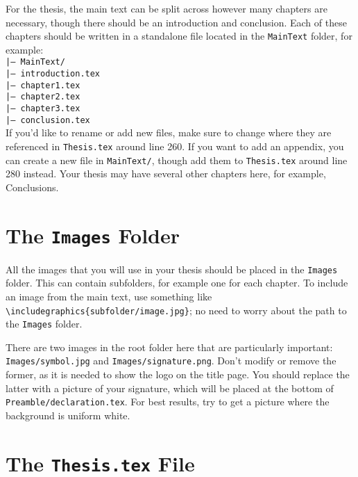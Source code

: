 For the thesis, the main text can be split across however many chapters are
necessary, though there should be an introduction and conclusion.
Each of these chapters should be written in a standalone file located in
the \texttt{MainText} folder, for example:
\texttt{
\\
|--- MainText/ \\ 
\hspace*{0.5cm}|--- introduction.tex\\
\hspace*{0.5cm}|--- chapter1.tex\\
\hspace*{0.5cm}|--- chapter2.tex\\
\hspace*{0.5cm}|--- chapter3.tex\\
\hspace*{0.5cm}|--- conclusion.tex\\
}
If you'd like to rename or add new files, make sure to change where they are
referenced in \texttt{Thesis.tex} around line 260. If you want
to add an appendix, you can create a new file in \texttt{MainText/}, though
add them to \texttt{Thesis.tex} around line 280 instead.
Your thesis may have several other chapters here, for example, Conclusions.

\section{The \texttt{Images} Folder}

All the images that you will use in your thesis should be placed in the \texttt{Images}
folder. This can contain subfolders, for example one for each chapter. To include
an image from the main text, use something like
\texttt{\textbackslash includegraphics\{subfolder/image.jpg\}}; no need to
worry about the path to the \texttt{Images} folder.

There are two images in the root folder here that are particularly important:
\texttt{Images/symbol.jpg} and \texttt{Images/signature.png}. Don't modify
or remove the former, as it is needed to show the logo on the title page.
You should replace the latter with a picture of your signature, which will
be placed at the bottom of \texttt{Preamble/declaration.tex}. For best
results, try to get a picture where the background is uniform white.

\section{The \texttt{Thesis.tex} File}

